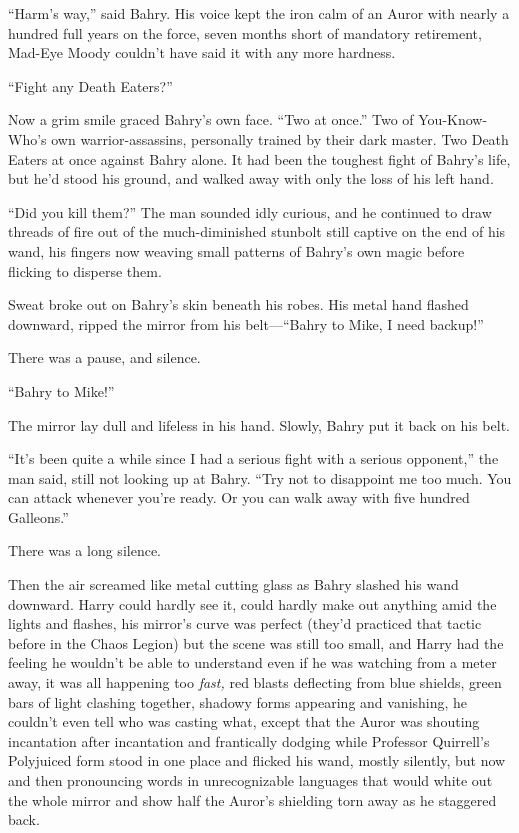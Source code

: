 “Harm’s way,” said Bahry. His voice kept the iron calm of an Auror with nearly a hundred full years on the force, seven months short of mandatory retirement, Mad-Eye Moody couldn’t have said it with any more hardness.

“Fight any Death Eaters?”

Now a grim smile graced Bahry’s own face. “Two at once.” Two of You-Know-Who’s own warrior-assassins, personally trained by their dark master. Two Death Eaters at once against Bahry alone. It had been the toughest fight of Bahry’s life, but he’d stood his ground, and walked away with only the loss of his left hand.

“Did you kill them?” The man sounded idly curious, and he continued to draw threads of fire out of the much-diminished stunbolt still captive on the end of his wand, his fingers now weaving small patterns of Bahry’s own magic before flicking to disperse them.

Sweat broke out on Bahry’s skin beneath his robes. His metal hand flashed downward, ripped the mirror from his belt—“Bahry to Mike, I need backup!”

There was a pause, and silence.

“Bahry to Mike!”

The mirror lay dull and lifeless in his hand. Slowly, Bahry put it back on his belt.

“It’s been quite a while since I had a serious fight with a serious opponent,” the man said, still not looking up at Bahry. “Try not to disappoint me too much. You can attack whenever you’re ready. Or you can walk away with five hundred Galleons.”

There was a long silence.

Then the air screamed like metal cutting glass as Bahry slashed his wand downward.
\sbreak
Harry could hardly see it, could hardly make out anything amid the lights and flashes, his mirror’s curve was perfect (they’d practiced that tactic before in the Chaos Legion) but the scene was still too small, and Harry had the feeling he wouldn’t be able to understand even if he was watching from a meter away, it was all happening too \emph{fast,} red blasts deflecting from blue shields, green bars of light clashing together, shadowy forms appearing and vanishing, he couldn’t even tell who was casting what, except that the Auror was shouting incantation after incantation and frantically dodging while Professor Quirrell’s Polyjuiced form stood in one place and flicked his wand, mostly silently, but now and then pronouncing words in unrecognizable languages that would white out the whole mirror and show half the Auror’s shielding torn away as he staggered back.

